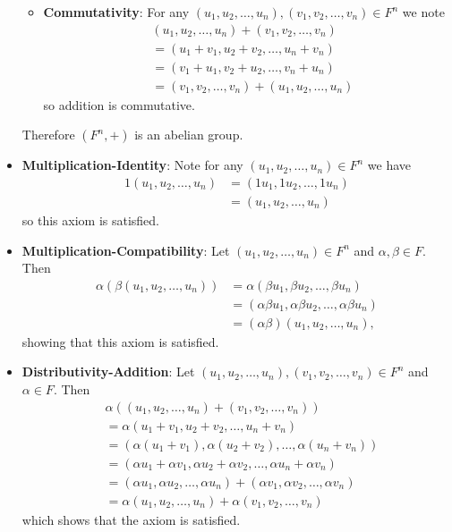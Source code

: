 \begin{questions}
\begin{itemize}
\begin{itemize}
            \item \textbf{Commutativity}: For any $(u_1, u_2, \dots, u_n), (v_1, v_2, \dots, v_n) \in F^n$ we note
            \begin{align*}
                &(u_1, u_2, \dots, u_n) + (v_1, v_2, \dots, v_n)\\
                &= (u_1 + v_1, u_2 + v_2, \dots, u_n + v_n)\\
                &= (v_1 + u_1, v_2 + u_2, \dots, v_n + u_n)\\
                &= (v_1, v_2, \dots, v_n) + (u_1, u_2, \dots, u_n)
            \end{align*}
            so addition is commutative.
        \end{itemize}
        Therefore $(F^n, +)$ is an abelian group.

        \item \textbf{Multiplication-Identity}: Note for any $(u_1, u_2, \dots, u_n) \in F^n$ we have
        \begin{align*}
            1(u_1, u_2, \dots, u_n) &= (1u_1, 1u_2, \dots, 1u_n)\\
            &= (u_1, u_2, \dots, u_n)
        \end{align*}
        so this axiom is satisfied.

        \item \textbf{Multiplication-Compatibility}: Let $(u_1, u_2, \dots, u_n) \in F^n$ and $\alpha, \beta \in F$. Then
        \begin{align*}
            \alpha(\beta(u_1, u_2, \dots, u_n)) &= \alpha(\beta u_1, \beta u_2, \dots, \beta u_n)\\
            &= (\alpha\beta u_1, \alpha\beta u_2, \dots, \alpha\beta u_n)\\
            &= (\alpha\beta)(u_1, u_2, \dots, u_n),
        \end{align*}
        showing that this axiom is satisfied.

        \item \textbf{Distributivity-Addition}: Let $(u_1, u_2, \dots, u_n), (v_1, v_2, \dots, v_n) \in F^n$ and $\alpha \in F$. Then
        \begin{align*}
            &\alpha((u_1, u_2, \dots, u_n) + (v_1, v_2, \dots, v_n))\\
            &= \alpha(u_1 + v_1, u_2 + v_2, \dots, u_n + v_n)\\
            &= (\alpha(u_1 + v_1), \alpha(u_2 + v_2), \dots, \alpha(u_n + v_n))\\
            &= (\alpha u_1 + \alpha v_1, \alpha u_2 + \alpha v_2, \dots, \alpha u_n + \alpha v_n)\\
            &= (\alpha u_1, \alpha u_2, \dots, \alpha u_n) + (\alpha v_1, \alpha v_2, \dots, \alpha v_n)\\
            &= \alpha(u_1, u_2, \dots, u_n) + \alpha(v_1, v_2, \dots, v_n)
        \end{align*}
        which shows that the axiom is satisfied.


\end{itemize}
\end{questions}
